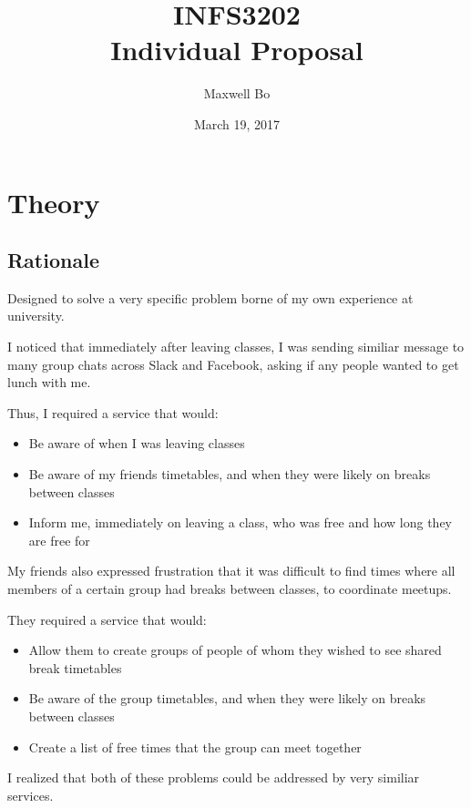 \documentclass[11pt,a4paper]{report}
\begin{document}
\title{INFS3202 \\ Individual Proposal}
\author{Maxwell Bo}
\date{March 19, 2017}
\maketitle

\chapter{Theory}

\section{Rationale}

Designed to solve a very specific problem borne of my own experience at university.

I noticed that immediately after leaving classes, I was sending similiar message to many group chats across Slack and Facebook, asking if any people wanted to get lunch with me.

Thus, I required a service that would:

\begin{itemize}
    \item Be aware of when I was leaving classes
    \item Be aware of my friends timetables, and when they were likely on breaks between classes
    \item Inform me, immediately on leaving a class, who was free and how long they are free for
\end{itemize}

My friends also expressed frustration that it was difficult to find times where all members of a certain group had breaks between classes, to coordinate meetups.

They required a service that would:

\begin{itemize}
    \item Allow them to create groups of people of whom they wished to see shared break timetables
    \item Be aware of the group timetables, and when they were likely on breaks between classes
    \item Create a list of free times that the group can meet together
\end{itemize}

I realized that both of these problems could be addressed by very similiar services. 
\end{document}

